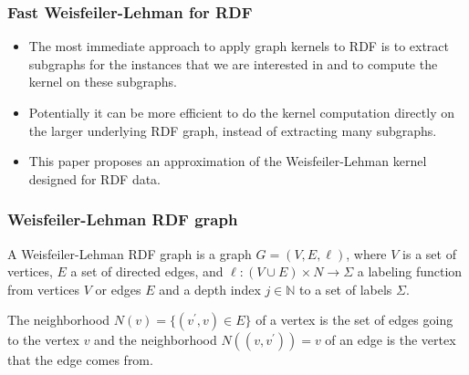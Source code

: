 \documentclass{beamer}
\begin{document}

\begin{frame}
\frametitle{Fast Weisfeiler-Lehman for RDF}

\begin{itemize}
\item
The most immediate approach to apply graph kernels to RDF is to extract subgraphs for the instances that we are interested in and to compute the kernel on these subgraphs.

\item
Potentially it can be more efficient to do the kernel computation directly on the larger underlying RDF graph, instead of extracting many subgraphs.

\item
This paper proposes an approximation of the Weisfeiler-Lehman kernel designed for RDF data.
\end{itemize}

\end{frame}


\begin{frame}
\frametitle{Weisfeiler-Lehman RDF graph}

\begin{definition}
A Weisfeiler-Lehman RDF graph is a graph $G = (V, E, \ell)$, where $V$ is a set of vertices, $E$ a set of directed edges, and $\ell:(V \cup E) \times N \rightarrow \Sigma$ a labeling function from vertices $V$ or edges $E$ and a depth index $j \in \mathbb{N}$ to a set of labels $\Sigma$.
\end{definition}

\begin{definition}[Neighborhood]
The neighborhood $N(v) = \{(v^\prime, v) \in E\}$ of a vertex is the set of edges going to the vertex $v$ and the neighborhood $N((v, v^\prime)) = {v}$ of an edge is the vertex that the edge comes from.
\end{definition}

\end{frame}
\end{document}
